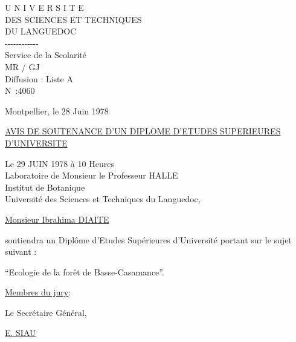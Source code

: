 \begin{center}
U N I V E R S I T E\\
DES SCIENCES ET TECHNIQUES\\
DU LANGUEDOC\\
-{}-{}-{}-{}-{}-{}-{}-{}-{}-{}-{}-\\
Service de la Scolarité\\
MR / GJ\\
Diffusion : Liste A\\
N\textdegree\ :4060
\end{center}
Montpellier, le 28 Juin 1978

\begin{center}
\uline{AVIS DE SOUTENANCE D'UN DIPLOME D'ETUDES SUPERIEURES D'UNIVERSITE}
\end{center}

Le 29 JUIN 1978 à 10 Heures\\
Laboratoire de Monsieur le Professeur HALLE\\
Institut de Botanique\\
Université des Sciences et Techniques du Languedoc,

\uline{Monsieur Ibrahima DIAITE}

soutiendra un Diplôme d'Etudes Supérieures d'Université portant sur le
sujet suivant :

``Ecologie de la forêt de Basse-Casamance''.

\uline{Membres du jury}:


Le Secrétaire Général,


\uline{E. SIAU}

